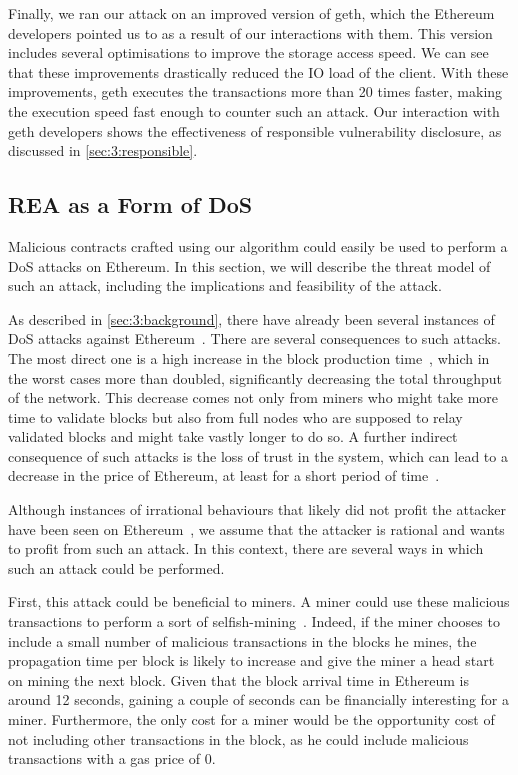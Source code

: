   Finally, we ran our attack on an improved version of geth, which the Ethereum developers pointed us to as a result of our interactions with them. This version includes several optimisations to improve the storage access speed. We can see that these improvements drastically reduced the IO load of the client. With these improvements, geth executes the transactions more than 20 times faster, making the execution speed fast enough to counter such an attack.
  Our interaction with geth developers shows the effectiveness of responsible vulnerability disclosure, as discussed in \autoref{sec:3:responsible}.

  \subsection{REA as a Form of DoS}
  Malicious contracts crafted using our algorithm could easily be used to perform a DoS attacks on Ethereum. In this section, we will describe the threat model of such an attack, including the implications and feasibility of the attack.

  As described in \autoref{sec:3:background}, there have already been several instances of DoS attacks against Ethereum~\cite{transaction-spam-attack,suicide-attack}.
  There are several consequences to such attacks.
  The most direct one is a high increase in the block production time~\cite{average-block-time}, which in the worst cases more than doubled, significantly decreasing the total throughput of the network.
  This decrease comes not only from miners who might take more time to validate blocks but also from full nodes who are supposed to relay validated blocks and might take vastly longer to do so.
  A further indirect consequence of such attacks is the loss of trust in the system, which can lead to a decrease in the price of Ethereum, at least for a short period of time~\cite{Chen2017Metering}.

  Although instances of irrational behaviours that likely did not profit the attacker have been seen on Ethereum~\cite{Breidenbach}, we assume that the attacker is rational and wants to profit from such an attack. In this context, there are several ways in which such an attack could be performed.

  First, this attack could be beneficial to miners. A miner could use these malicious transactions to perform a sort of selfish-mining~\cite{eyal2014majority}.
  Indeed, if the miner chooses to include a small number of malicious transactions in the blocks he mines, the propagation time per block is likely to increase and give the miner a head start on mining the next block.
  Given that the block arrival time in Ethereum is around 12 seconds, gaining a couple of seconds can be financially interesting for a miner. Furthermore, the only cost for a miner would be the opportunity cost of not including other transactions in the block, as he could include malicious transactions with a gas price of 0.

